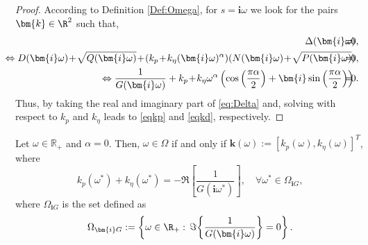 \documentclass[twoside,reqno,11pt]{fcaa-var} %
\begin{document}
\begin{proof}	
	According to Definition \ref{Def:Omega}, for $s=\bm{i}\omega$ we look for the pairs $\bm{k}\in\R^2$ such that,%
%	
	\begin{eqnarray}
	\Delta(\bm{i}\omega)\!\!\!\!\!\!\!\!&=&\!\!\!\!\!\!\!0,\notag\\
	\!\!\!\!\!\!\!\!\!\!\Leftrightarrow D(\bm{i}\omega)\!+\!\sqrt{Q(\bm{i}\omega)}\!+\!(k_p\!+\!k_\eta(\bm{i}\omega)^\alpha)(N(\bm{i}\omega)\!+\!\sqrt{P(\bm{i}\omega)})\!\!\!\!\!\!\!\!&=&\!\!\!\!\!\!\!0,\notag\\
	\!\!\!\!\!\!\!\!\!\!\Leftrightarrow\frac{1}{G(\bm{i}\omega)}+k_p\!+\!k_\eta\omega^\alpha\left(\cos \left(\frac{\pi  \alpha}{2}\right)+\bm{i} \sin \left(\frac{\pi  \alpha}{2}\right)\right)\!\!\!\!\!\!\!&=&\!\!\!\!\!\!\!0.\label{eq:Delta}
	\end{eqnarray}	
	Thus, by taking the real and imaginary part of \eqref{eq:Delta} and, solving with respect to $k_p$ and $k_\eta$ leads to \eqref{eqkp} and \eqref{eqkd}, respectively.%
\end{proof}
\begin{proposition}[CRB, $\alpha=0$]\label{prop:CRB2}
	Let $\omega\in\mathbb{R}_+$ and $\alpha=0$. Then, $\omega\in\Omega$ if and only if $\bm{k}(\omega):=\left[k_p(\omega),k_\eta(\omega)\right]^T$, where
	\begin{equation} 
k_p(\omega^{\ast})+k_\eta(\omega^{\ast})=-\Re\!\left[\frac{1}{G(\bm{i}\omega^{\ast})}\right],\quad \forall\omega^{\ast}\in\Omega_{\bm{i}G},\label{eqkp2}
	\end{equation}
where $\Omega_{\bm{i}G}$ is the set defined as
\[
\Omega_{\bm{i}G}:=\left\{\omega\in\R_+:\,\Im\!\left\{\frac{1}{G(\bm{i}\omega)}\right\}=0\right\}.
\]
\end{proposition}
\end{document}
